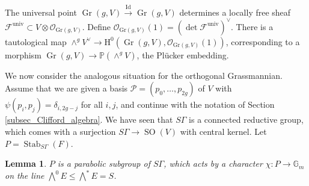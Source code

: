 \documentclass{article} %
\newtheorem{lemma}[proposition]{Lemma}
\numberwithin{equation}{section}
\newcommand{\G}{\mathbb{G}}
\DeclareMathOperator{\SO}{SO}
\DeclareMathOperator{\Id}{Id}
\DeclareMathOperator{\Stab}{Stab}
\newcommand{\sh}[1]{\mathscr{#1}}
\renewcommand{\P}{\mathbb{P}}
\renewcommand{\O}{\mathcal{O}}
\newcommand{\HH}{\mathrm{H}}
\DeclareMathOperator{\Gr}{Gr}
\begin{document}
The universal point $\Gr(g,V)\xrightarrow{\Id} \Gr(g,V)$ determines a locally free sheaf $\sh{F}^{\mathrm{univ}}\subset V\otimes \O_{\mathrm{Gr}(g,V)}$. 
Define $\O_{\mathrm{Gr}(g,V)}(1) = (\det \sh{F}^{\mathrm{univ}})^{\vee}$. There is a tautological map $\wedge^g V^\vee \to \HH^0(\Gr(g, V), \O_{\mathrm{Gr}(g,V)}(1))$, corresponding to a morphism $\Gr(g, V) \to \P(\wedge^g V)$, the Pl\"ucker embedding.

We now consider the analogous situation for the orthogonal Grassmannian. 
Assume that we are given a basis $\mathcal{P} = (p_0, \dots, p_{2g})$ of $V$ with $\psi(p_i, p_j) = \delta_{i,2g-j}$ for all $i,j$, and continue with the notation of Section \ref{subsec_Clifford_algebra}.
We have seen that $S \Gamma$ is a connected reductive group, which comes with a surjection $S \Gamma \to \SO(V)$ with central kernel. Let $P = \Stab_{S \Gamma}(F)$. 
\begin{lemma}\label{lem_action_of_maximal_parabolic_on_vacuum_vector}
    $P$ is a parabolic subgroup of $S \Gamma$, which acts by a character $\chi : P \to \G_m$ on the line $\bigwedge^0 E \leq \bigwedge^\ast E = S$.
\end{lemma}
\end{document}
